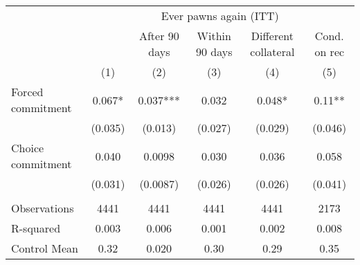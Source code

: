 \begin{tabular}{lccccc}
\toprule
      & \multicolumn{5}{c}{Ever pawns again (ITT)} \\
\cmidrule{2-6}      &       & After 90 days & Within 90 days & Different collateral & Cond. on rec \\
\midrule
\midrule
      & (1)   & (2)   & (3)   & (4)   & (5) \\
\midrule
\midrule
Forced commitment & 0.067* & 0.037*** & 0.032 & 0.048* & 0.11** \\
      & (0.035) & (0.013) & (0.027) & (0.029) & (0.046) \\
Choice commitment & 0.040 & 0.0098 & 0.030 & 0.036 & 0.058 \\
      & (0.031) & (0.0087) & (0.026) & (0.026) & (0.041) \\
      &       &       &       &       &  \\
\midrule
Observations & 4441  & 4441  & 4441  & 4441  & 2173 \\
R-squared & 0.003 & 0.006 & 0.001 & 0.002 & 0.008 \\
Control Mean & 0.32  & 0.020 & 0.30  & 0.29  & 0.35 \\
\bottomrule
\bottomrule
\end{tabular}%
